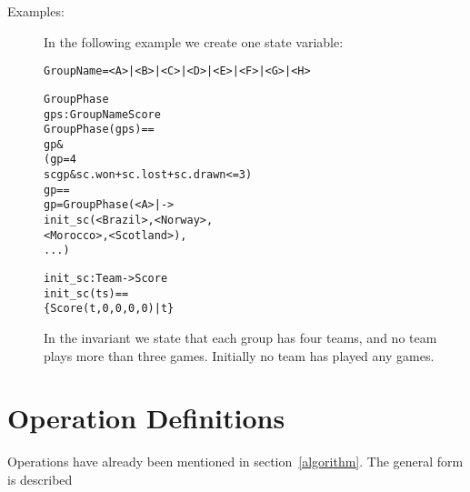 \documentclass[\pformat,12pt]{article}
\begin{document}
\begin{description}
\item[Examples:] In the following example we create one state variable:
  \begin{alltt}

  GroupName = <A> | <B> | <C> | <D> | <E> | <F> | <G> | <H>

   GroupPhase 
    gps :  GroupName  Score
  GroupPhase(gps) ==
     gp  & 
      ( gp = 4 
        sc  gp & sc.won + sc.lost + sc.drawn <= 3)
   gp ==
    gp = GroupPhase ({ <A> |-> 
                                init_sc ({<Brazil>, <Norway>, 
                                    <Morocco>, <Scotland>}),
                         ...})


  init_sc :  Team ->  Score
  init_sc (ts) ==
    \{ Score (t,0,0,0,0) | t  \}
  \end{alltt}
  In the invariant we state that each group has four teams, and no team 
  plays more than three games. Initially no team has played any games.

\end{description}

\section{Operation Definitions} \label{op-def}

Operations have already been mentioned in section~\ref{algorithm}. The
general form is described
\end{document}
